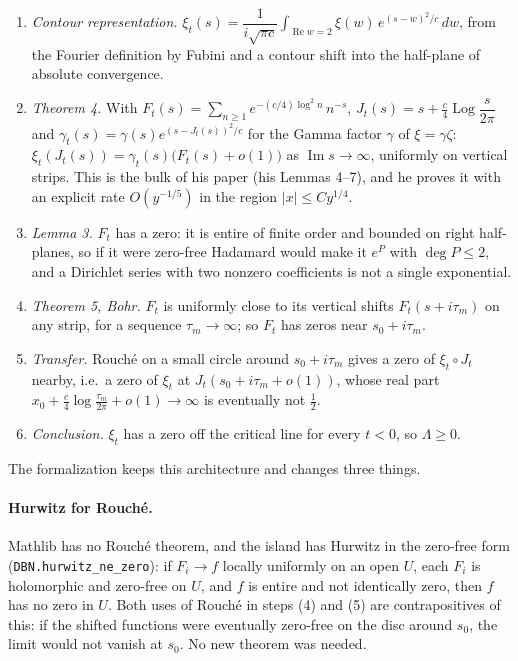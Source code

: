 \documentclass[11pt]{article}
\theoremstyle{definition}
\newcommand{\lean}[1]{\texttt{#1}}
\newcommand{\Lam}{\Lambda}
\newcommand{\re}{\operatorname{Re}}
\newcommand{\im}{\operatorname{Im}}
\newcommand{\Log}{\operatorname{Log}}
\begin{document}
\begin{enumerate}[label=(\arabic*),leftmargin=2em]
\item \emph{Contour representation.} $\xi_t(s) = \dfrac{1}{i\sqrt{\pi c}}\displaystyle\int_{\re w = 2}\xi(w)\,e^{(s-w)^2/c}\,dw$, from the Fourier definition by Fubini and a contour shift into the half-plane of absolute convergence.
\item \emph{Theorem 4.} With $F_t(s) = \sum_{n\ge1} e^{-(c/4)\log^2 n}\,n^{-s}$, $J_t(s) = s + \tfrac{c}{4}\Log\dfrac{s}{2\pi}$ and $\gamma_t(s) = \gamma(s)e^{(s - J_t(s))^2/c}$ for the Gamma factor $\gamma$ of $\xi = \gamma\zeta$: $\xi_t(J_t(s)) = \gamma_t(s)\bigl(F_t(s) + o(1)\bigr)$ as $\im s \to \infty$, uniformly on vertical strips. This is the bulk of his paper (his Lemmas 4--7), and he proves it with an explicit rate $O(y^{-1/5})$ in the region $|x| \le Cy^{1/4}$.
\item \emph{Lemma 3.} $F_t$ has a zero: it is entire of finite order and bounded on right half-planes, so if it were zero-free Hadamard would make it $e^{P}$ with $\deg P \le 2$, and a Dirichlet series with two nonzero coefficients is not a single exponential.
\item \emph{Theorem 5, Bohr.} $F_t$ is uniformly close to its vertical shifts $F_t(s + i\tau_m)$ on any strip, for a sequence $\tau_m \to \infty$; so $F_t$ has zeros near $s_0 + i\tau_m$.
\item \emph{Transfer.} Rouch\'e on a small circle around $s_0 + i\tau_m$ gives a zero of $\xi_t \circ J_t$ nearby, i.e.\ a zero of $\xi_t$ at $J_t(s_0 + i\tau_m + o(1))$, whose real part $x_0 + \tfrac{c}{4}\log\tfrac{\tau_m}{2\pi} + o(1) \to \infty$ is eventually not $\tfrac12$.
\item \emph{Conclusion.} $\xi_t$ has a zero off the critical line for every $t<0$, so $\Lam \ge 0$.
\end{enumerate}

The formalization keeps this architecture and changes three things.

\paragraph{Hurwitz for Rouch\'e.} Mathlib has no Rouch\'e theorem, and the island has Hurwitz in the zero-free form (\lean{DBN.hurwitz\_ne\_zero}): if $F_i \to f$ locally uniformly on an open $U$, each $F_i$ is holomorphic and zero-free on $U$, and $f$ is entire and not identically zero, then $f$ has no zero in $U$. Both uses of Rouch\'e in steps (4) and (5) are contrapositives of this: if the shifted functions were eventually zero-free on the disc around $s_0$, the limit would not vanish at $s_0$. No new theorem was needed.
\end{document}
